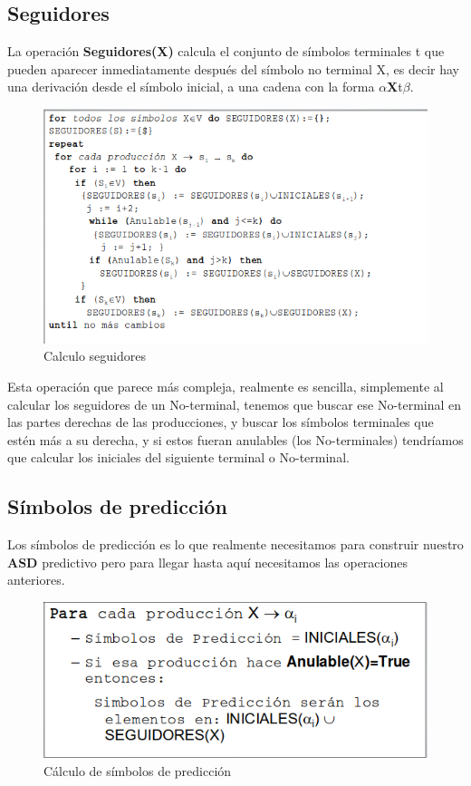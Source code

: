 \subsection{Seguidores}
La operación \textbf{Seguidores(X)} calcula el conjunto de símbolos terminales t que pueden aparecer inmediatamente después del símbolo no terminal X, es decir hay una derivación desde el símbolo inicial, a una cadena con la forma $\alpha$\textbf{X}t$\beta$. \cite{PL2}

\begin{figure}[h]
	\centering
	\includegraphics[width=0.7\linewidth]{img/seg}
	\caption{Calculo seguidores}
	\label{fig:seg}
\end{figure}

Esta operación que parece más compleja, realmente es sencilla, simplemente al calcular los seguidores de un No-terminal, tenemos que buscar ese No-terminal en las partes derechas de las producciones, y buscar los símbolos terminales que estén más a su derecha, y si estos fueran anulables (los No-terminales) tendríamos que calcular los iniciales del siguiente terminal o No-terminal.

\subsection{Símbolos de predicción}
Los símbolos de predicción es lo que realmente necesitamos para construir nuestro \textbf{ASD} predictivo pero para llegar hasta aquí necesitamos las operaciones anteriores.

\begin{figure}[h]
	\centering
	\includegraphics[width=0.7\linewidth]{img/predict}
	\caption{Cálculo de símbolos de predicción}
	\label{fig:seg}
\end{figure}

